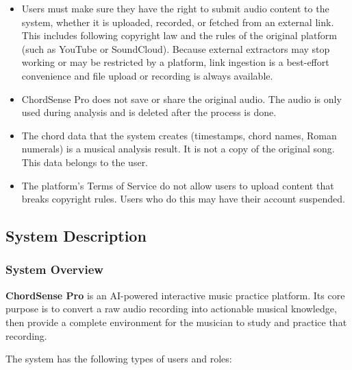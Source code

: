 \documentclass[a4paper]{article}
\begin{document}
\begin{itemize}
    \item Users must make sure they have the right to submit audio content to the system, whether it is uploaded, recorded, or fetched from an external link. This includes following copyright law and the rules of the original platform (such as YouTube or SoundCloud). Because external extractors may stop working or may be restricted by a platform, link ingestion is a best-effort convenience and file upload or recording is always available.
    \item ChordSense Pro does not save or share the original audio. The audio is only used during analysis and is deleted after the process is done.
    \item The chord data that the system creates (timestamps, chord names, Roman numerals) is a musical analysis result. It is not a copy of the original song. This data belongs to the user.
    \item The platform's Terms of Service do not allow users to upload content that breaks copyright rules. Users who do this may have their account suspended.
\end{itemize}

\subsection{System Description}

\subsubsection{System Overview}

\textbf{ChordSense Pro} is an AI-powered interactive music practice platform. Its core purpose is to convert a raw audio recording into actionable musical knowledge, then provide a complete environment for the musician to study and practice that recording.

The system has the following types of users and roles:
\end{document}
